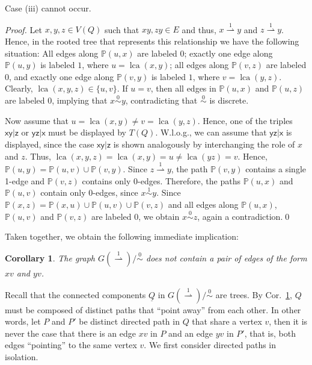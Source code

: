 \documentclass[smallextended]{svjour3}
\newcommand{\Ro}{\mathrel{\overset{0}{\sim}}}
\newcommand{\Rl}{\mathrel{\overset{1}{\sim}}}
\newcommand{\Rld}{\mathrel{\overset{1}{\rightharpoonup}}}
\newcommand{\lca}[1]{\mathop{lca}(#1)}
\newcommand{\rt}[1]{\ensuremath{\mathsf{#1}}}
\newtheorem{cor}[thm]{Corollary}
\begin{document}
\begin{lemma}
  Case (iii) cannot occur.
  \label{lem:case-iii}
\end{lemma}
\begin{proof}
  Let $x,y,z\in V(Q)$ such that $xy, zy \in E$ and thus, $x\Rld y$ and $z
  \Rld y$.  Hence, in the rooted tree that represents this relationship we
  have the following situation: All edges along $\mathbb{P}(u,x)$ are
  labeled $0$; exactly one edge along $\mathbb{P}(u,y)$ is labeled $1$,
  where $u=\lca{x,y}$; all edges along $\mathbb{P}(v,z)$ are labeled $0$,
  and exactly one edge along $\mathbb{P}(v,y)$ is labeled $1$, where
  $v=\lca{y,z}$.  Clearly, $\lca{x,y,z}\in \{u,v\}$.  If $u=v$, then all
  edges in $\mathbb{P}(u,x)$ and $\mathbb{P}(u,z)$ are labeled $0$,
  implying that $x\Ro y$, contradicting that $\Ro$ is discrete.
	
  Now assume that $u=\lca{x,y}\neq v=\lca{y,z}$.  Hence, one of the triples
  $\rt{xy|z}$ or $\rt{yz|x}$ must be displayed by $T(Q)$.  W.l.o.g., we can
  assume that $\rt{yz|x}$ is displayed, since the case $\rt{xy|z}$ is shown
  analogously by interchanging the role of $x$ and $z$.  Thus, $\lca{x,y,z}
  = \lca{x, y} = u\neq \lca{yz}=v$. Hence, $\mathbb{P}(u,y) =
  \mathbb{P}(u,v) \cup \mathbb{P}(v,y)$.  Since $z\Rld y$, the path
  $\mathbb{P}(v,y)$ contains a single 1-edge and $\mathbb{P}(v,z)$ contains
  only 0-edges. Therefore, the paths $\mathbb{P}(u,x)$ and
  $\mathbb{P}(u,v)$ contain only 0-edges, since $x\Rl y$.  Since
  $\mathbb{P}(x,z) = \mathbb{P}(x,u)\cup \mathbb{P}(u,v)\cup
  \mathbb{P}(v,z)$ and all edges along $\mathbb{P}(u,x)$, $\mathbb{P}(u,v)$
  and $\mathbb{P}(v,z)$ are labeled $0$, we obtain $x\Ro z$, again a
  contradiction.\qed
\end{proof}

Taken together, we obtain the following immediate implication:
\begin{cor}
  The graph $G(\Rld)/\Ro$ does not contain a pair of edges of the form $xv$
  and $yv$.
\label{cor:edge-pointing}
\end{cor}

Recall that the connected components $\underline{Q}$ in $G(\Rld)/\Ro$ are
trees. By Cor.\ \ref{cor:edge-pointing}, $Q$ must be composed of
distinct paths that ``point away'' from each other.  In other words,
  let $P$ and $P'$ be distinct directed path in $Q$ that share a vertex
  $v$, then it is never the case that there is an edge $xv$ in $P$ and an
  edge $yv$ in $P'$, that is, both edges ``pointing'' to the same vertex
  $v$. We first consider directed paths in isolation.
\end{document}
